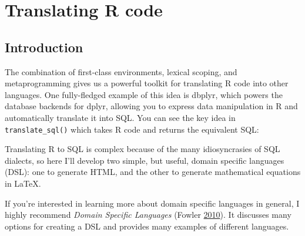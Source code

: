 \documentclass[]{book}
\newenvironment{Shaded}{\begin{snugshade}}{\end{snugshade}}
\newcommand{\CommentTok}[1]{\textcolor[rgb]{0.37,0.37,0.37}{\textit{#1}}}
\newcommand{\DecValTok}[1]{\textcolor[rgb]{0.06,0.06,0.06}{#1}}
\newcommand{\KeywordTok}[1]{\textcolor[rgb]{0.27,0.27,0.27}{\textbf{#1}}}
\newcommand{\NormalTok}[1]{#1}
\newcommand{\OperatorTok}[1]{\textcolor[rgb]{0.43,0.43,0.43}{\textbf{#1}}}
\newcommand{\StringTok}[1]{\textcolor[rgb]{0.5,0.5,0.5}{#1}}
\begin{document}
\hypertarget{translation}{%
\chapter{Translating R code}\label{translation}}

\hypertarget{introduction-4}{%
\section{Introduction}\label{introduction-4}}

The combination of first-class environments, lexical scoping, and metaprogramming gives us a powerful toolkit for translating R code into other languages. One fully-fledged example of this idea is dbplyr, which powers the database backends for dplyr, allowing you to express data manipulation in R and automatically translate it into SQL. You can see the key idea in \texttt{translate\_sql()} which takes R code and returns the equivalent SQL:

\begin{Shaded}
\end{Shaded}

Translating R to SQL is complex because of the many idiosyncrasies of SQL dialects, so here I'll develop two simple, but useful, domain specific languages (DSL): one to generate HTML, and the other to generate mathematical equations in LaTeX.

If you're interested in learning more about domain specific languages in general, I highly recommend \emph{Domain Specific Languages} (Fowler \protect\hyperlink{ref-dsls}{2010}). It discusses many options for creating a DSL and provides many examples of different languages.
\end{document}
